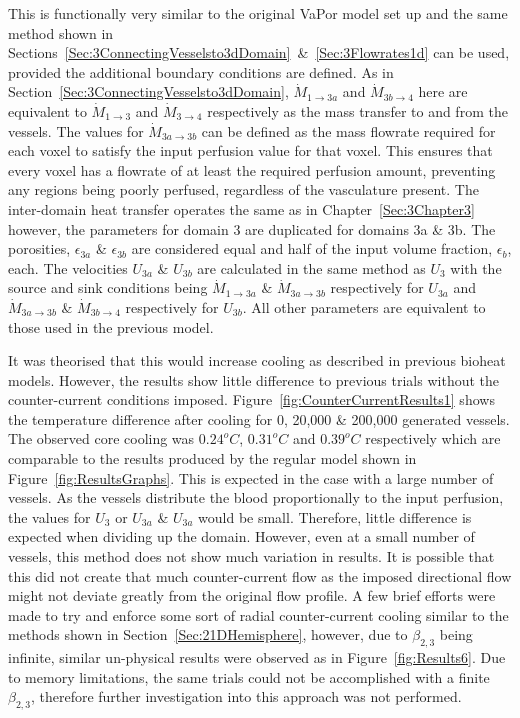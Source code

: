 \documentclass[11pt,english,a4paper,twoside,openright]{report}
\begin{document}
{{{{{{{This is functionally very similar to the original VaPor model set up and the same method shown in Sections~\ref{Sec:3ConnectingVesselsto3dDomain}~\&~\ref{Sec:3Flowrates1d} can be used, provided the additional boundary conditions are defined. As in Section~\ref{Sec:3ConnectingVesselsto3dDomain}, $\dot{M}_{1\rightarrow3a}$ and $\dot{M}_{3b\rightarrow4}$ here are equivalent to $\dot{M}_{1\rightarrow3}$ and $\dot{M}_{3\rightarrow4}$ respectively as the mass transfer to and from the vessels. The values for $\dot{M}_{3a\rightarrow3b}$ can be defined as the mass flowrate required for each voxel to satisfy the input perfusion value for that voxel. This ensures that every voxel has a flowrate of at least the required perfusion amount, preventing any regions being poorly perfused, regardless of the vasculature present. The inter-domain heat transfer operates the same as in Chapter~\ref{Sec:3Chapter3} however, the parameters for domain 3 are duplicated for domains 3a \& 3b. The porosities, $\epsilon_{3a}$ \& $\epsilon_{3b}$ are considered equal and half of the input volume fraction, $\epsilon_{b}$, each. The velocities $U_{3a}$ \& $U_{3b}$ are calculated in the same method as $U_{3}$ with the source and sink conditions being $\dot{M}_{1\rightarrow3a}$ \& $\dot{M}_{3a\rightarrow3b}$ respectively for $U_{3a}$ and $\dot{M}_{3a\rightarrow3b}$ \& $\dot{M}_{3b\rightarrow4}$ respectively for $U_{3b}$. All other parameters are equivalent to those used in the previous model.

It was theorised that this would increase cooling as described in previous bioheat models. However, the results show little difference to previous trials without the counter-current conditions imposed. Figure~\ref{fig:CounterCurrentResults1} shows the temperature difference after cooling for 0, 20,000 \& 200,000 generated vessels. The observed core cooling was $0.24^{o}C$, $0.31^{o}C$ and $0.39^{o}C$ respectively which are comparable to the results produced by the regular model shown in Figure~\ref{fig:ResultsGraphs}. This is expected in the case with a large number of vessels. As the vessels distribute the blood proportionally to the input perfusion, the values for $U_{3}$ or $U_{3a}$ \& $U_{3a}$ would be small. Therefore, little difference is expected when dividing up the domain. However, even at a small number of vessels, this method does not show much variation in results. It is possible that this did not create that much counter-current flow as the imposed directional flow might not deviate greatly from the original flow profile. A few brief efforts were made to try and enforce some sort of radial counter-current cooling similar to the methods shown in Section~\ref{Sec:21DHemisphere}, however, due to $\beta_{2,3}$ being infinite, similar un-physical results were observed as in Figure~\ref{fig:Results6}. Due to memory limitations, the same trials could not be accomplished with a finite $\beta_{2,3}$, therefore further investigation into this approach was not performed.

}}}}}}}
\end{document}
